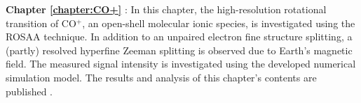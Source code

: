 \textbf{Chapter \ref{chapter:CO+}} \emph{}: In this chapter, the high-resolution rotational transition of CO$^+$, an open-shell molecular ionic species, is investigated using the ROSAA technique. In addition to an unpaired electron fine structure splitting, a (partly) resolved hyperfine Zeeman splitting is observed due to Earth's magnetic field. The measured signal intensity is investigated using the developed numerical simulation model. The results and analysis of this chapter's contents are published \cite{marimuthu_zeeman_2022}.\\

